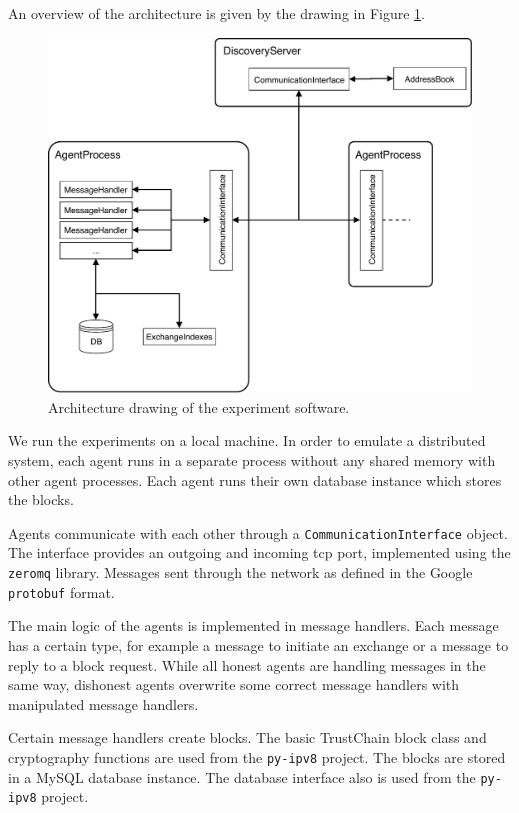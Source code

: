 An overview of the architecture is given by the drawing in Figure \ref{fig:software_architecture}.

\begin{figure}[h!]
  \centering
  \includegraphics[width=\textwidth]{images/architecture.pdf}
  \caption{Architecture drawing of the experiment software.}
  \label{fig:software_architecture}
\end{figure}

We run the experiments on a local machine. In order to emulate a distributed system, each agent 
runs in a separate process without any shared memory with other agent processes. Each agent runs 
their own database instance which stores the blocks. 

Agents communicate with each other through a \verb|CommunicationInterface| object. The interface 
provides an outgoing and incoming tcp port, implemented using the  \verb|zeromq| library. Messages
sent through the network as defined in the Google \verb|protobuf| format. 

The main logic of the agents is implemented in message handlers. Each message has a certain type,
for example a message to initiate an exchange or a message to reply to a block request. While all 
honest agents are handling messages in the same way, dishonest agents overwrite some correct 
message handlers with manipulated message handlers. 

Certain message handlers create blocks. The basic TrustChain block class and cryptography functions
are used from the \verb|py-ipv8| project. The blocks are stored in a MySQL database instance. The 
database interface also is used from the \verb|py-ipv8| project.

